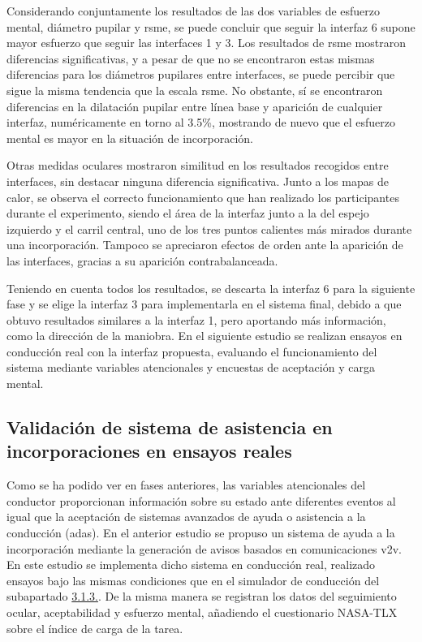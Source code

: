Considerando conjuntamente los resultados de las dos variables de esfuerzo mental, diámetro pupilar y \gls{rsme}, se puede concluir que seguir la interfaz 6 supone mayor esfuerzo que seguir las interfaces 1 y 3. Los resultados de \gls{rsme} mostraron diferencias significativas, y a pesar de que no se encontraron estas mismas diferencias para los diámetros pupilares entre interfaces, se puede percibir que sigue la misma tendencia que la escala \gls{rsme}. No obstante, sí se encontraron diferencias en la dilatación pupilar entre línea base y aparición de cualquier interfaz, numéricamente en torno al 3.5\%, mostrando de nuevo que el esfuerzo mental es mayor en la situación de incorporación. 

Otras medidas oculares mostraron similitud en los resultados recogidos entre interfaces, sin destacar ninguna diferencia significativa. Junto a los mapas de calor, se observa el correcto funcionamiento que han realizado los participantes durante el experimento, siendo el área de la interfaz junto a la del espejo izquierdo y el carril central, uno de los tres puntos calientes más mirados durante una incorporación. Tampoco se apreciaron efectos de orden ante la aparición de las interfaces, gracias a su aparición contrabalanceada.

Teniendo en cuenta todos los resultados, se descarta la interfaz 6 para la siguiente fase y se elige la interfaz 3 para implementarla en el sistema final, debido a que obtuvo resultados similares a la interfaz 1, pero aportando más información, como la dirección de la maniobra. En el siguiente estudio se realizan ensayos en conducción real con la interfaz propuesta, evaluando el funcionamiento del sistema mediante variables atencionales y encuestas de aceptación y carga mental.

\subsection{Validación de sistema de asistencia en incorporaciones en ensayos reales}\label{314}

Como se ha podido ver en fases anteriores, las variables atencionales del conductor proporcionan información sobre su estado ante diferentes eventos al igual que la aceptación de sistemas avanzados de ayuda o asistencia a la conducción (\gls{adas}). En el anterior estudio se propuso un sistema de ayuda a la incorporación mediante la generación de avisos basados en comunicaciones \gls{v2v}. En este estudio se implementa dicho sistema en conducción real, realizado ensayos bajo las mismas condiciones que en el simulador de conducción del subapartado \hyperref[313]{3.1.3.}. De la misma manera se registran los datos del seguimiento ocular, aceptabilidad y esfuerzo mental, añadiendo el cuestionario NASA-TLX sobre el índice de carga de la tarea. 

